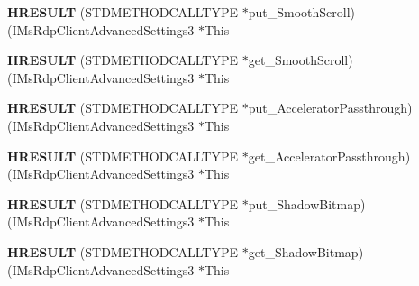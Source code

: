\begin{DoxyCompactItemize}
\mbox{\label{struct_i_ms_rdp_client_advanced_settings3_vtbl_a0bcfc989a9e3332137dc14f6f79be061}} 
{\bfseries H\+R\+E\+S\+U\+LT} (S\+T\+D\+M\+E\+T\+H\+O\+D\+C\+A\+L\+L\+T\+Y\+PE $\ast$put\+\_\+\+Smooth\+Scroll)(I\+Ms\+Rdp\+Client\+Advanced\+Settings3 $\ast$This
\item 
\mbox{\label{struct_i_ms_rdp_client_advanced_settings3_vtbl_a64e5166e840c0a56045747d133b80e08}} 
{\bfseries H\+R\+E\+S\+U\+LT} (S\+T\+D\+M\+E\+T\+H\+O\+D\+C\+A\+L\+L\+T\+Y\+PE $\ast$get\+\_\+\+Smooth\+Scroll)(I\+Ms\+Rdp\+Client\+Advanced\+Settings3 $\ast$This
\item 
\mbox{\label{struct_i_ms_rdp_client_advanced_settings3_vtbl_afd1b713e7a33fe0193a98f814f26c310}} 
{\bfseries H\+R\+E\+S\+U\+LT} (S\+T\+D\+M\+E\+T\+H\+O\+D\+C\+A\+L\+L\+T\+Y\+PE $\ast$put\+\_\+\+Accelerator\+Passthrough)(I\+Ms\+Rdp\+Client\+Advanced\+Settings3 $\ast$This
\item 
\mbox{\label{struct_i_ms_rdp_client_advanced_settings3_vtbl_a040549a23070fc4767b4ea6d33e402b0}} 
{\bfseries H\+R\+E\+S\+U\+LT} (S\+T\+D\+M\+E\+T\+H\+O\+D\+C\+A\+L\+L\+T\+Y\+PE $\ast$get\+\_\+\+Accelerator\+Passthrough)(I\+Ms\+Rdp\+Client\+Advanced\+Settings3 $\ast$This
\item 
\mbox{\label{struct_i_ms_rdp_client_advanced_settings3_vtbl_a0e6370ff28ac31ec12f7a1540c225d7c}} 
{\bfseries H\+R\+E\+S\+U\+LT} (S\+T\+D\+M\+E\+T\+H\+O\+D\+C\+A\+L\+L\+T\+Y\+PE $\ast$put\+\_\+\+Shadow\+Bitmap)(I\+Ms\+Rdp\+Client\+Advanced\+Settings3 $\ast$This
\item 
\mbox{\label{struct_i_ms_rdp_client_advanced_settings3_vtbl_ade706ea71fd337c188f1cd7e1e47e8fd}} 
{\bfseries H\+R\+E\+S\+U\+LT} (S\+T\+D\+M\+E\+T\+H\+O\+D\+C\+A\+L\+L\+T\+Y\+PE $\ast$get\+\_\+\+Shadow\+Bitmap)(I\+Ms\+Rdp\+Client\+Advanced\+Settings3 $\ast$This
\item 
\mbox{\label{struct_i_ms_rdp_client_advanced_settings3_vtbl_a59d54cd59bb2ed6347269f2d8504ef55}} 

\end{DoxyCompactItemize}

